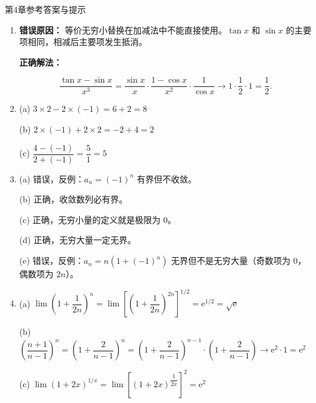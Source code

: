 \documentclass[aspectratio=169,10pt,fontset=fandol]{ctexbeamer}
\newcommand{\ee}{\mathrm{e}}
\begin{document}
\begin{frame}[t,fragile]{第4章参考答案与提示}
{\begin{enumerate}
\item[7.] 

   \textbf{错误原因：} 等价无穷小替换在加减法中不能直接使用。\(\tan x\) 和 \(\sin x\) 的主要项相同，相减后主要项发生抵消。

   

   \textbf{正确解法：}

   \[

   \frac{\tan x-\sin x}{x^3}

   =\frac{\sin x}{x}\cdot\frac{1-\cos x}{x^2}\cdot\frac1{\cos x}

   \longrightarrow 1\cdot\frac12\cdot1=\frac12.

   \]



\item[8.] 

   (a) \(3 \times 2 - 2 \times (-1) = 6 + 2 = 8\) \quad

   (b) \(2 \times (-1) + 2 \times 2 = -2 + 4 = 2\) \quad

   (c) \(\dfrac{4 - (-1)}{2 + (-1)} = \dfrac{5}{1} = 5\)



\item[9.] 

   (a) 错误，反例：\(a_n = (-1)^n\) 有界但不收敛。\quad

   (b) 正确，收敛数列必有界。\quad

   (c) 正确，无穷小量的定义就是极限为 0。\quad

   (d) 正确，无穷大量一定无界。\quad

   (e) 错误，反例：\(a_n = n(1+(-1)^n)\) 无界但不是无穷大量（奇数项为 0，偶数项为 \(2n\)）。



\item[10.] 

(a) \(\lim\left(1+\dfrac{1}{2n}\right)^n = \lim\left[\left(1+\dfrac{1}{2n}\right)^{2n}\right]^{1/2} = \ee^{1/2} = \sqrt{\ee}\) \quad

   (b) \(\left(\dfrac{n+1}{n-1}\right)^n = \left(1 + \dfrac{2}{n-1}\right)^n = \left(1 + \dfrac{2}{n-1}\right)^{n-1} \cdot \left(1 + \dfrac{2}{n-1}\right) \to \ee^2 \cdot 1 = \ee^2\) \quad

   (c) \(\lim (1+2x)^{1/x} = \lim \left[(1+2x)^{\dfrac{1}{2x}}\right]^2 = \ee^2\)

\end{enumerate}
}
\end{frame}
\end{document}
